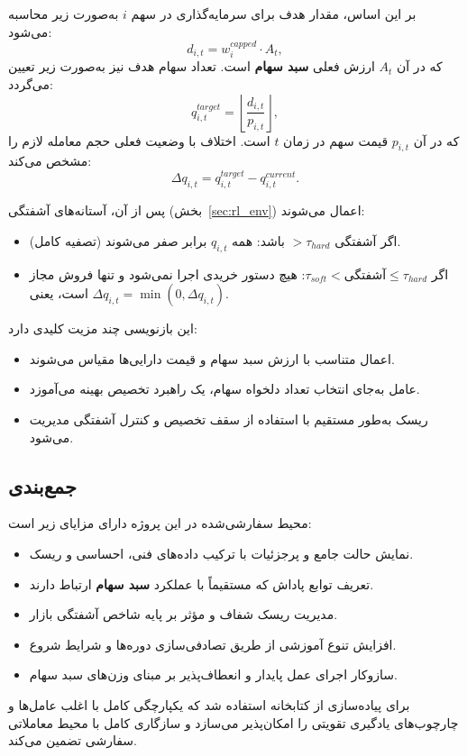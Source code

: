 \documentclass[12pt, a4paper]{report}
\begin{document}
بر این اساس، مقدار هدف برای سرمایه‌گذاری در سهم $i$ به‌صورت زیر محاسبه می‌شود:
\[
d_{i,t} = w_i^{capped} \cdot A_t,
\]
که در آن $A_t$ ارزش فعلی \textbf{سبد سهام} است.  
تعداد سهام هدف نیز به‌صورت زیر تعیین می‌گردد:
\[
q_{i,t}^{target} = \left\lfloor \frac{d_{i,t}}{p_{i,t}} \right\rfloor,
\]
که در آن $p_{i,t}$ قیمت سهم در زمان $t$ است.  
اختلاف با وضعیت فعلی حجم معامله لازم را مشخص می‌کند:
\[
\Delta q_{i,t} = q_{i,t}^{target} - q_{i,t}^{current}.
\]

پس از آن، آستانه‌های آشفتگی (بخش~\ref{sec:rl_env}) اعمال می‌شوند:
\begin{itemize}
    \item اگر آشفتگی $> \tau_{hard}$ باشد: همه $q_{i,t}$ برابر صفر می‌شوند (تصفیه کامل).  
    \item اگر $\tau_{soft} < \text{آشفتگی} \leq \tau_{hard}$: هیچ دستور خریدی اجرا نمی‌شود و تنها فروش مجاز است، یعنی $\Delta q_{i,t} = \min(0, \Delta q_{i,t})$.  
\end{itemize}

این بازنویسی چند مزیت کلیدی دارد:
\begin{itemize}
    \item اعمال متناسب با ارزش سبد سهام و قیمت دارایی‌ها مقیاس می‌شوند.  
    \item عامل به‌جای انتخاب تعداد دلخواه سهام، یک راهبرد تخصیص بهینه می‌آموزد.  
    \item ریسک به‌طور مستقیم با استفاده از سقف تخصیص و کنترل آشفتگی مدیریت می‌شود.  
\end{itemize}

\subsection{جمع‌بندی}
محیط سفارشی‌شده در این پروژه دارای مزایای زیر است:
\begin{itemize}
    \item نمایش حالت جامع و پرجزئیات با ترکیب داده‌های فنی، احساسی و ریسک.  
    \item تعریف توابع پاداش که مستقیماً با عملکرد \textbf{سبد سهام} ارتباط دارند.  
    \item مدیریت ریسک شفاف و مؤثر بر پایه شاخص آشفتگی بازار.  
    \item افزایش تنوع آموزشی از طریق تصادفی‌سازی دوره‌ها و شرایط شروع.  
    \item سازوکار اجرای عمل پایدار و انعطاف‌پذیر بر مبنای وزن‌های سبد سهام.  
\end{itemize}

برای پیاده‌سازی از کتابخانه  استفاده شد که یکپارچگی کامل با اغلب عامل‌ها و چارچوب‌های یادگیری تقویتی را امکان‌پذیر می‌سازد و سازگاری کامل با محیط معاملاتی سفارشی تضمین می‌کند.  
\end{document}
